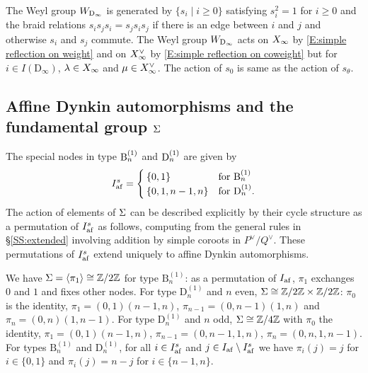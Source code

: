 \documentclass[a4paper]{amsart}
\newcommand{\ike}[1]{\todo[size=\tiny,color=blue!30]{#1}}
\newcommand{\koushik}[1]{\todo[size=\tiny,color=green!30]{#1}}
\newcommand{\smark}[1]{\todo[size=\tiny,color=cyan!30]{#1}}
\theoremstyle{remark}
\numberwithin{equation}{section}
\begin{document}
The Weyl group $W_{\mathrm{D}_{\infty}}$ is generated by 
$\{s_i\mid i\geq 0\}$ satisfying $s_i^2=1$ for $i\ge 0$ and the braid relations $s_is_{j}s_i=s_{j}s_is_{j}$ if there is an edge between $i$ and $j$ and otherwise
$s_i$ and $s_j$ commute. 
The Weyl group $W_{\mathrm{D}_{\infty}}$ acts on $X_\infty$ by 
\eqref{E:simple reflection on weight} and on $X_\infty^\vee$ by  
\eqref{E:simple reflection on coweight} but for $i\in I(\mathrm{D}_\infty)$, $\lambda\in X_\infty$ and $\mu\in X_\infty^\vee$. The action of $s_0$ is same as the action of $s_\theta$.


\subsection{Affine Dynkin automorphisms and the fundamental group $\Sigma$}

The special nodes in type $\mathrm{B}_{n}^{(1)}$ and $\mathrm{D}_{n}^{(1)}$ are given by
\begin{align*}
  I_{\mathrm{af}}^s = \begin{cases}
      \{0,1\} & \text{for $\mathrm{B}_n^{(1)}$} \\
      \{0,1,n-1,n\} &\text{for $\mathrm{D}_n^{(1)}$.}
  \end{cases}
\end{align*}
The action of elements of $\Sigma$ can be described explicitly by their cycle structure as a permutation of $I_{\mathrm{af}}^s$ as follows, computing from the general rules in \S \ref{SS:extended} involving addition by simple coroots in $P^\vee/Q^\vee$.
These permutations of $I_{\mathrm{af}}^s$ extend uniquely to affine Dynkin automorphisms.

We have $\Sigma = \langle \pi_1 \rangle \cong \mathbb{Z}/2\mathbb{Z}$ for type $\mathrm{B}_n^{(1)}$: as a permutation of $I_{\mathrm{af}}$, $\pi_1$ exchanges $0$ and $1$ and fixes other nodes. 
For type $\mathrm{D}_n^{(1)}$ and $n$ even, $\Sigma\cong \mathbb{Z}/2\mathbb{Z}\times \mathbb{Z}/2\mathbb{Z}$:  $\pi_0$ is the identity, $\pi_1 = (0,1)(n-1,n)$,
$\pi_{n-1}=(0,n-1)(1,n)$
and $\pi_n=(0,n)(1,n-1)$.
For type $\mathrm{D}_n^{(1)}$ and $n$ odd, $\Sigma\cong \mathbb{Z}/4\mathbb{Z}$ with $\pi_0$ the identity,
$\pi_1=(0,1)(n-1,n)$, $\pi_{n-1}=(0,n-1,1,n)$, $\pi_n=(0,n,1,n-1)$. For types $\mathrm{B}_n^{(1)}$ and $\mathrm{D}_n^{(1)}$, for all $i\in I^s_{\mathrm{af}}$ and $j\in I_{\mathrm{af}}\setminus I^s_{\mathrm{af}}$ we have $\pi_i(j)=j$ for $i\in\{0,1\}$ and $\pi_i(j)=n-j$ for $i\in \{n-1,n\}$.
\end{document}

